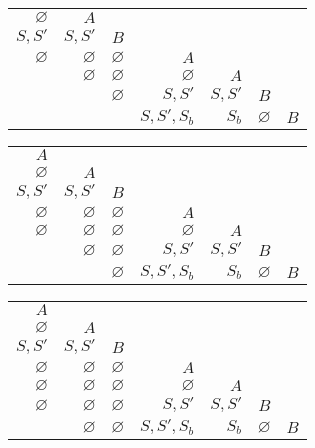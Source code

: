 \documentclass[12pt]{article}
\newenvironment{Problems}{
	\begin{enumerate}[]
	}{       
	\end{enumerate}
}
\begin{document}
\begin{Problems}
\begin{center}
\begin{tabular}{|r|r|r|r|r|r|r|}
			\cline{1-2}
			$\varnothing$ & $A$\\
			\cline{1-3}
			$S, S'$ & $S, S'$ & $B$\\
			\cline{1-4}
			$\varnothing$ & $\varnothing$ & $\varnothing$ & $A$\\
			\cline{1-5}
			& $\varnothing$ & $\varnothing$ & $\varnothing$ & $A$\\
			\cline{1-6}
			& & $\varnothing$ & $S, S'$ & $S, S'$ & $B$\\
			\hline
			& & & $S, S', S_b$ & $S_b$& $\varnothing$ & $B$\\
			\hline
		\end{tabular}
	\end{center}
	\begin{center}
		\begin{tabular}{|r|r|r|r|r|r|r|}
			\cline{1-1}
			$A$\\
			\cline{1-2}
			$\varnothing$ & $A$\\
			\cline{1-3}
			$S, S'$ & $S, S'$ & $B$\\
			\cline{1-4}
			$\varnothing$ & $\varnothing$ & $\varnothing$ & $A$\\
			\cline{1-5}
			$\varnothing$ & $\varnothing$ & $\varnothing$ & $\varnothing$ & $A$\\
			\cline{1-6}
			& $\varnothing$ & $\varnothing$ & $S, S'$ & $S, S'$ & $B$\\
			\hline
			& & $\varnothing$ & $S, S', S_b$ & $S_b$& $\varnothing$ & $B$\\
			\hline
		\end{tabular}
	\end{center}
	\begin{center}
		\begin{tabular}{|r|r|r|r|r|r|r|}
			\cline{1-1}
			$A$\\
			\cline{1-2}
			$\varnothing$ & $A$\\
			\cline{1-3}
			$S, S'$ & $S, S'$ & $B$\\
			\cline{1-4}
			$\varnothing$ & $\varnothing$ & $\varnothing$ & $A$\\
			\cline{1-5}
			$\varnothing$ & $\varnothing$ & $\varnothing$ & $\varnothing$ & $A$\\
			\cline{1-6}
			$\varnothing$ & $\varnothing$ & $\varnothing$ & $S, S'$ & $S, S'$ & $B$\\
			\hline
			& $\varnothing$ & $\varnothing$ & $S, S', S_b$ & $S_b$& $\varnothing$ & $B$\\
			\hline
		\end{tabular}
	\end{center}

\end{Problems}
\end{document}
